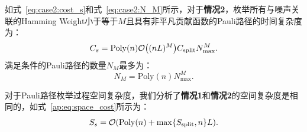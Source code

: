 如式~\eqref{eq:case2:cost_s}和式~\eqref{eq:case2:N_M}所示，对于\textbf{情况2}，枚举所有与噪声关联的Hamming Weight小于等于$M$且具有非平凡贡献函数的Pauli路径的时间复杂度为：
\begin{equation*}
    C_s=\mathrm{Poly}(n) \order{(nL)^{M}} C_{\text{split}} N_{\text{max}}^{M}.
\end{equation*}
满足条件的Pauli路径的数量$N_M$最多为：
\begin{equation*}
    N_M=\mathrm{Poly}(n) N_{\text{max}}^{M}.
\end{equation*}


对于Pauli路径枚举过程空间复杂度，我们分析了\textbf{情况1}和\textbf{情况2}的空间复杂度是相同的，如式~\eqref{ap:eq:space_cost}所示为：
\begin{equation*}
S_s=\order{\mathrm{Poly}(n)+\max\{S_{\text{split}},n\}L}.
\end{equation*}

